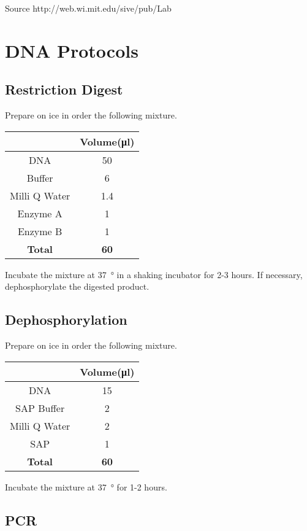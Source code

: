 \documentclass[../main.tex]{subfiles}
\begin{document}
Source http://web.wi.mit.edu/sive/pub/Lab%


\section{DNA Protocols}
\subsection{Restriction Digest}
Prepare on ice in order the following mixture.


\begin{center}
\begin{tabular}{c|c}
				&	\textbf{Volume(\si{\micro\litre})} 	\\\hline
DNA				&	50									\\
Buffer			&	6									\\
Milli Q Water	&	1.4									\\
Enzyme A			&	1									\\
Enzyme B			&	1									\\\hline
\textbf{Total}	&	\textbf{60}					
\end{tabular}
\end{center}

Incubate the mixture at \SI{37}{\degree} in a shaking incubator for 2-3 hours.
If necessary, dephosphorylate the digested product.

\subsection{Dephosphorylation}
Prepare on ice in order the following mixture.

\begin{center}
\begin{tabular}{c|c}
				&	\textbf{Volume(\si{\micro\litre})} 	\\\hline
DNA				&	15									\\
SAP Buffer		&	2									\\
Milli Q Water	&	2									\\
SAP				&	1									\\\hline
\textbf{Total}	&	\textbf{60}					
\end{tabular}
\end{center}

Incubate the mixture at \SI{37}{\degree} for 1-2 hours.

\subsection{PCR}
\end{document}
